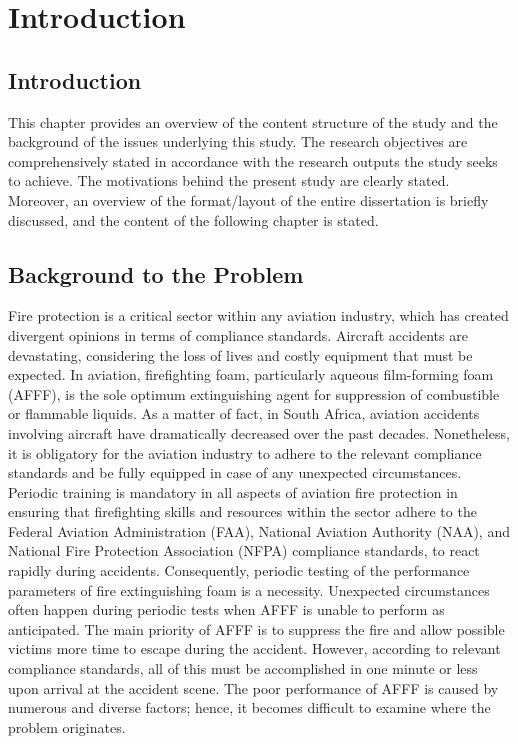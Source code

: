 \chapter{Introduction}
\section{Introduction}
This chapter provides an overview of the content structure of the study and the background of the issues underlying this study. The research objectives are comprehensively stated in accordance with the research outputs the study seeks to achieve. The motivations behind the present study are clearly stated. Moreover, an overview of the format/layout of the entire dissertation is briefly discussed, and the content of the following chapter is stated.

\section{Background to the Problem}
Fire protection is a critical sector within any aviation industry, which has created divergent opinions in terms of compliance standards. Aircraft accidents are devastating, considering the loss of lives and costly equipment that must be expected. In aviation, firefighting foam, particularly aqueous film-forming foam (AFFF), is the sole optimum extinguishing agent for suppression of combustible or flammable liquids. As a matter of fact, in South Africa, aviation accidents involving aircraft have dramatically decreased over the past decades. Nonetheless, it is obligatory for the aviation industry to adhere to the relevant compliance standards and be fully equipped in case of any unexpected circumstances.
Periodic training is mandatory in all aspects of aviation fire protection in ensuring that firefighting skills and resources within the sector adhere to the Federal Aviation Administration (FAA), National Aviation Authority (NAA), and National Fire Protection Association (NFPA) compliance standards, to react rapidly during accidents. Consequently, periodic testing of the performance parameters of fire extinguishing foam is a necessity. Unexpected circumstances often happen during periodic tests when AFFF is unable to perform as anticipated. The main priority of AFFF is to suppress the fire and allow possible victims more time to escape during the accident. However, according to relevant compliance standards, all of this must be accomplished in one minute or less upon arrival at the accident scene. The poor performance of AFFF is caused by numerous and diverse factors; hence, it becomes difficult to examine where the problem originates.

